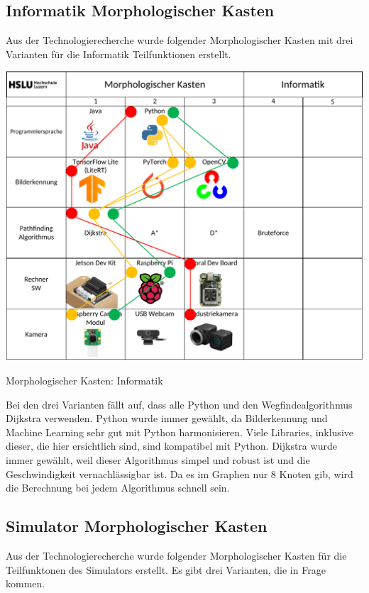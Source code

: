 \subsection{Informatik Morphologischer Kasten}

Aus der Technologierecherche wurde folgender Morphologischer Kasten mit drei Varianten für die Informatik Teilfunktionen erstellt.

\begin{table}[H]
\centering
\includegraphics[width=\textwidth]{assets/MK_Informatik.pdf}
\caption{Morphologischer Kasten: Informatik}
\label{table:mk-informatik}
\end{table}


Bei den drei Varianten fällt auf, dass alle Python und den Wegfindealgorithmus Dijkstra verwenden. Python wurde immer gewählt, da Bilderkennung und Machine Learning sehr gut mit Python harmonisieren. Viele Libraries, inklusive dieser, die hier ersichtlich sind, sind kompatibel mit Python. Dijkstra wurde immer gewählt, weil dieser Algorithmus simpel und robust ist und die Geschwindigkeit vernachlässigbar ist. Da es im Graphen nur 8 Knoten gib, wird die Berechnung bei jedem Algorithmus schnell sein.

\subsection{Simulator Morphologischer Kasten}


Aus der Technologierecherche wurde folgender Morphologischer Kasten für die Teilfunktonen des Simulators erstellt. Es gibt drei Varianten, die in Frage kommen.

